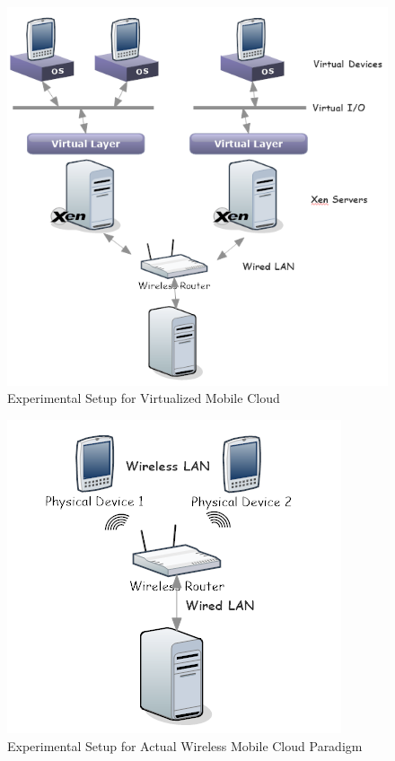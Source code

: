 \documentclass[journal,comsoc]{IEEEtran}
\begin{document}
\begin{figure}[htbp]
\begin{center}
\includegraphics[width=0.8\linewidth]{vnet_arch.png} 
\end{center}	   
\caption{Experimental Setup for Virtualized Mobile Cloud}\label{vnet_arch}
\end{figure}

\begin{figure}[htbp]
\begin{center}
\includegraphics[width=0.8\linewidth]{pnet_arch.png} 
\end{center}	   
\caption{Experimental Setup for Actual Wireless Mobile Cloud Paradigm}\label{pnet_arch}
\end{figure}
\end{document}
